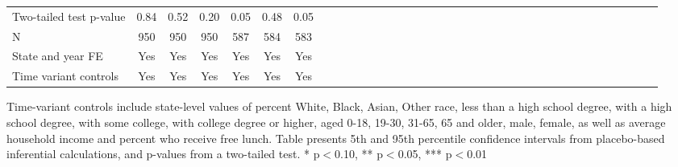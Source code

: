 \begin{table}[htbp]
\begin{center}
\begin{threeparttable}
\begin{tabular}{l*{6}{c c c c c c}}
Two-tailed test p-value&     \cellcolor[cmyk]{0.2,0,0,0}     0.84   &    \cellcolor[cmyk]{0.2,0,0,0}      0.52   &      \cellcolor[cmyk]{0.2,0,0,0}    0.20   &        0.05   &        0.48   &        0.05   \\
N                   &         950   &         950   &         950   &         587   &         584   &         583   \\
\midrule
State and year FE                              & Yes   & Yes   & Yes   & Yes   & Yes   & Yes            \\
Time variant controls                  & Yes   & Yes   & Yes   & Yes   & Yes   & Yes            \\
\bottomrule
\end{tabular}
\begin{tablenotes}
\tiny
\item Time-variant controls include state-level values of percent White, Black, Asian, Other race, less than a high school degree, with a high school degree, with some college, with college degree or higher, aged 0-18, 19-30, 31-65, 65 and older, male, female, as well as average household income and percent who receive free lunch.  Table presents 5th and 95th percentile confidence intervals from placebo-based inferential calculations, and p-values from a two-tailed test. * p$<$0.10, ** p$<$0.05, *** p$<$0.01
\end{tablenotes}
\end{threeparttable}
\end{center}
\end{table}
